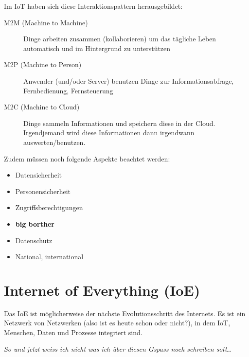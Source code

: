 Im IoT haben sich diese Interaktionspattern herausgebildet:
\begin{description}
	\item[M2M (Machine to Machine)] Dinge arbeiten zusammen (kollaborieren) um das tägliche Leben automatisch und im Hintergrund zu unterstützen
	\item[M2P (Machine to Person)] Anwender (und/oder Server) benutzen Dinge zur Informationsabfrage, Fernbedienung, Fernsteuerung
	\item[M2C (Machine to Cloud)] Dinge sammeln Informationen und speichern diese in der Cloud. Irgendjemand wird diese Informationen dann irgendwann auswerten/benutzen.
\end{description}
Zudem müssen noch folgende Aspekte beachtet werden:
\begin{itemize}
	\item Datensicherheit
	\item Personensicherheit
	\item Zugriffsberechtigungen
	\item \textbf{big borther}
	\item Datenschutz
	\item National, international
\end{itemize}

\section{Internet of Everything (IoE)}

Das IoE ist möglicherweise der nächste Evolutionsschritt des Internets. Es ist ein Netzwerk von Netzwerken (also ist es heute schon oder nicht?), in dem IoT, Menschen, Daten und Prozesse integriert sind.

\textit{So und jetzt weiss ich nicht was ich über diesen Gspass noch schreiben soll\dots}